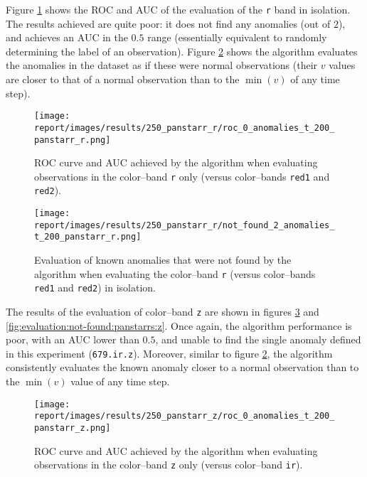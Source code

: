 
Figure \ref{fig:evaluation:roc:panstarrs:r} shows the ROC and AUC of the evaluation of the \panstarrs \texttt{r} band in isolation. The results achieved are quite poor: it does not find any anomalies (out of $2$), and achieves an AUC in the $0.5$ range (essentially equivalent to randomly determining the label of an observation). Figure \ref{fig:evaluation:not-found:panstarrs:r} shows the \mlblink algorithm evaluates the anomalies in the dataset as if these were normal observations (their $v$ values are closer to that of a normal observation than to the $\min(v)$ of any time step).

\begin{figure}[H]
  \centering
  \texttt{[image: report/images/results/250\_panstarr\_r/roc\_0\_anomalies\_t\_200\_panstarr\_r.png]}
  \caption{ROC curve and AUC achieved by the \mlblink algorithm when evaluating observations in the \panstarrs color--band \texttt{r} only (versus \usno color--bands \texttt{red1} and \texttt{red2}).}
  \label{fig:evaluation:roc:panstarrs:r}
\end{figure}

\begin{figure}[H]
  \centering
  \texttt{[image: report/images/results/250\_panstarr\_r/not\_found\_2\_anomalies\_t\_200\_panstarr\_r.png]}
  \caption{Evaluation of known anomalies that were not found by the \mlblink algorithm when evaluating the \panstarrs color--band \texttt{r} (versus \usno color--bands \texttt{red1} and \texttt{red2}) in isolation.}
  \label{fig:evaluation:not-found:panstarrs:r}
\end{figure}


The results of the evaluation of \panstarrs color--band \texttt{z} are shown in figures \ref{fig:evaluation:roc:panstarrs:z} and \ref{fig:evaluation:not-found:panstarrs:z}. Once again, the \mlblink algorithm performance is poor, with an AUC lower than $0.5$, and unable to find the single anomaly defined in this experiment (\texttt{679.ir.z}). Moreover, similar to figure \ref{fig:evaluation:not-found:panstarrs:r}, the \mlblink algorithm consistently evaluates the known anomaly closer to a normal observation than to the $\min(v)$ value of any time step.

\begin{figure}[H]
  \centering
  \texttt{[image: report/images/results/250\_panstarr\_z/roc\_0\_anomalies\_t\_200\_panstarr\_z.png]}
  \caption{ROC curve and AUC achieved by the \mlblink algorithm when evaluating observations in the \panstarrs color--band \texttt{z} only (versus \usno color--band \texttt{ir}).}
  \label{fig:evaluation:roc:panstarrs:z}
\end{figure}

